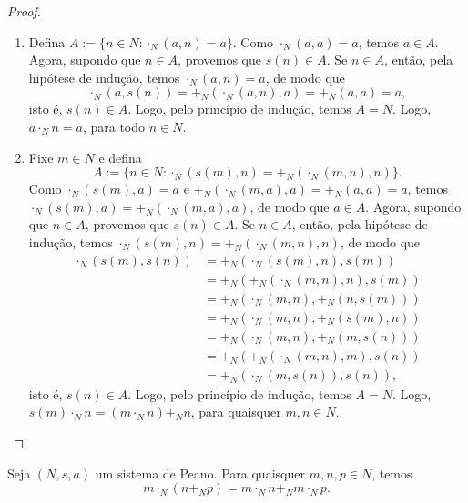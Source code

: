 \begin{proof}
    \leavevmode
        \begin{enumerate}[leftmargin=*, align=left, label=\textbf{(\alph*)}]
            \item Defina $A := \{n \in N : \cdot_N (a,n) = a\}$. Como $\cdot_N (a,a) = a$, temos $a \in A$. Agora, supondo que $n \in A$, provemos que $s(n) \in A$. Se $n \in A$, então, pela hipótese de indução, temos $\cdot_N (a,n) = a$, de modo que
                \[
                    \cdot_N (a, s(n)) = +_N (\cdot_N (a, n), a) = +_N (a, a) = a,
                \]
            isto é, $s(n) \in A$. Logo, pelo princípio de indução, temos $A = N$. Logo, $a \cdot_N n = a$, para todo $n \in N$. \blackproof
            \item Fixe $m \in N$ e defina
                \[
                    A := \{n \in N : \cdot_N (s(m),n) = +_N (\cdot_N (m,n), n)\}.
                \]
            Como $\cdot_N (s(m),a) = a$ e $+_N (\cdot_N (m,a), a) = +_N (a, a) = a$, temos $\cdot_N (s(m),a) = +_N (\cdot_N (m,a), a)$, de modo que $a \in A$. Agora, supondo que $n \in A$, provemos que $s(n) \in A$. Se $n \in A$, então, pela hipótese de indução, temos $\cdot_N (s(m),n) = +_N (\cdot_N (m,n), n)$, de modo que
                \begin{align*}
                    \cdot_N (s(m), s(n)) &= +_N (\cdot_N (s(m), n), s(m)) \\
                    &= +_N (+_N (\cdot_N (m, n), n), s(m)) \\
                    &= +_N (\cdot_N (m, n), +_N (n, s(m))) \\
                    &= +_N (\cdot_N (m, n), +_N (s(m), n)) \\
                    &= +_N (\cdot_N (m, n), +_N (m, s(n))) \\
                    &= +_N (+_N (\cdot_N (m, n), m), s(n)) \\
                    &= +_N (\cdot_N (m, s(n)), s(n)),
                \end{align*}
            isto é, $s(n) \in A$. Logo, pelo princípio de indução, temos $A = N$. Logo, $s(m) \cdot_N n = (m \cdot_N n) +_N n$, para quaisquer $m,n \in N$. \blackproof
        \end{enumerate}
\end{proof}

\begin{proposition}
    Seja $(N,s,a)$ um sistema de Peano. Para quaisquer $m,n,p \in N$, temos
        \[
            m \cdot_N (n +_N p) = m \cdot_N n +_N m \cdot_N p.
        \] 
\end{proposition}

